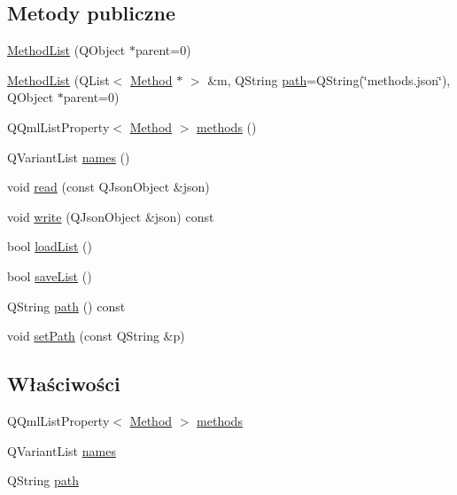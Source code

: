 \subsection*{Metody publiczne}
\begin{DoxyCompactItemize}
\item 
\hyperlink{class_method_list_ae859d2576fa0bd370d458af57948e22e}{Method\-List} (Q\-Object $\ast$parent=0)
\item 
\hyperlink{class_method_list_ac434ec0f3fea8b75ac0762d235441206}{Method\-List} (Q\-List$<$ \hyperlink{class_method}{Method} $\ast$ $>$ \&m, Q\-String \hyperlink{class_method_list_aac51cd62c2c4e2cfb7a4a8053555ea61}{path}=Q\-String(\char`\"{}methods.\-json\char`\"{}), Q\-Object $\ast$parent=0)
\item 
Q\-Qml\-List\-Property$<$ \hyperlink{class_method}{Method} $>$ \hyperlink{class_method_list_ac0e3f7172a72d25b66a50289d67a1e0f}{methods} ()
\item 
Q\-Variant\-List \hyperlink{class_method_list_a23142d6732e57d998153b8f4be2bc974}{names} ()
\item 
void \hyperlink{class_method_list_ae9a0004ee6cbe2f7cccc1cbd5f5488bb}{read} (const Q\-Json\-Object \&json)
\item 
void \hyperlink{class_method_list_af0d4511d7f5bfb5003a33e8c0d50b4bd}{write} (Q\-Json\-Object \&json) const 
\item 
bool \hyperlink{class_method_list_aaad20483391f3c7f6ffe68a7a4973353}{load\-List} ()
\item 
bool \hyperlink{class_method_list_a76d02473ee8a03c714c72c202fdd20f4}{save\-List} ()
\item 
Q\-String \hyperlink{class_method_list_ad2eb51d43787a28502722c7ef92b6f84}{path} () const 
\item 
void \hyperlink{class_method_list_ae08b28e21d8f75374c5d6e295516eeeb}{set\-Path} (const Q\-String \&p)
\end{DoxyCompactItemize}
\subsection*{Właściwości}
\begin{DoxyCompactItemize}
\item 
Q\-Qml\-List\-Property$<$ \hyperlink{class_method}{Method} $>$ \hyperlink{class_method_list_a10fa462526af745e0ef24c024a7e252e}{methods}
\item 
Q\-Variant\-List \hyperlink{class_method_list_ac96a3d7bc8ad7419795cf194448ca2c4}{names}
\item 
Q\-String \hyperlink{class_method_list_aac51cd62c2c4e2cfb7a4a8053555ea61}{path}
\end{DoxyCompactItemize}
